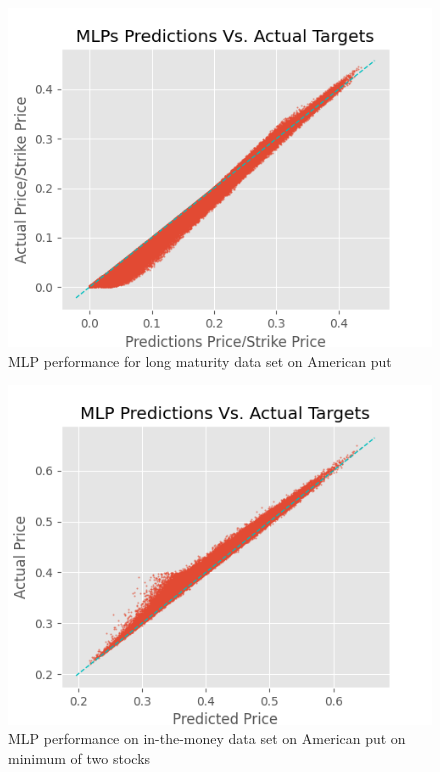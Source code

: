 \begin{figure}[th]
\centering
\includegraphics{Figures/longTAmerP.png}
\decoRule
\caption[MLP Performance for Long Maturity Data Set American Put]{MLP performance for long maturity data set on American put}
\label{fig:MLPsAmerPLongT}
\end{figure}

\begin{figure}[th]
\centering
\includegraphics{Figures/inMoneyAmerMinP.png}
\decoRule
\caption[MLP Performance for In-the-Money Data Set Bivariate American Contingent Claim]{MLP performance on in-the-money data set on American put on minimum of two stocks}
\label{fig:MLPsAmerMin2}
\end{figure}

